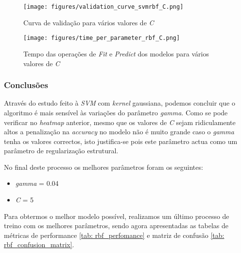 \begin{figure}[htp]
\centering
\texttt{[image: figures/validation\_curve\_svmrbf\_C.png]}
\caption{Curva de validação para vários valores de \textit{C}}
\label{fig:model_svm_C}
\end{figure}

 
\begin{figure}[htp]
\centering
\texttt{[image: figures/time\_per\_parameter\_rbf\_C.png]}
\caption{Tempo das operações de \textit{Fit} e \textit{Predict} dos modelos para vários valores de \textit{C}}
\label{fig:time_operations_rbf_C}
\end{figure}


\subsubsection{Conclusões}
Através do estudo feito à \textit{SVM} com \textit{kernel} gaussiana, podemos concluir que o algoritmo é mais sensível às variações do parâmetro \textit{gamma}. Como se pode verificar no \textit{heatmap} anterior, mesmo que os valores de \textit{C} sejam ridiculamente altos a penalização na \textit{accuracy} no modelo não é muito grande caso o \textit{gamma} tenha os valores correctos, isto justifica-se pois este parâmetro actua como um parâmetro de regularização estrutural.

No final deste processo os melhores parâmetros foram os seguintes:
\begin{itemize}
    \item \textit{gamma} = 0.04
    \item \textit{C} = 5
\end{itemize}

Para obtermos o melhor modelo possível, realizamos um último processo de treino com os melhores parâmetros, sendo agora apresentadas as tabelas de métricas de performance \ref{tab: rbf_perfomance} e matriz de confusão \ref{tab: rbf_confusion_matrix}.


